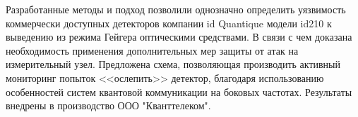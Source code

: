 Разработанные методы и подход позволили однозначно определить уязвимость коммерчески доступных детекторов компании id Quantique модели id210 к выведению из режима Гейгера оптическими средствами. В связи с чем доказана необходимость применения дополнительных мер защиты от атак на измерительный узел. Предложена схема, позволяющая производить активный мониторинг попыток <<ослепить>> детектор, благодаря использованию особенностей систем квантовой коммуникации на боковых частотах. Результаты внедрены в производство ООО "Кванттелеком". 




